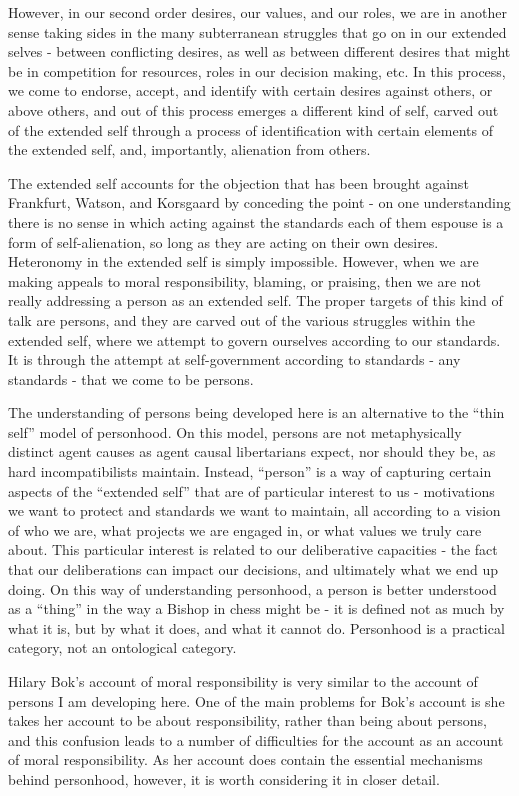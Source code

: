 \documentclass[phd,12pt,oneside,paper=letterpaper]{ubcthesis}
\begin{document}
However, in our second order desires, our values, and our roles, we are in another sense taking sides in the many subterranean struggles that go on in our extended selves - between conflicting desires, as well as between different desires that might be in competition for resources, roles in our decision making, etc. In this process, we come to endorse, accept, and identify with certain desires against others, or above others, and out of this process emerges a different kind of self, carved out of the extended self through a process of identification with certain elements of the extended self, and, importantly, alienation from others. 

The extended self accounts for the objection that has been brought against Frankfurt, Watson, and Korsgaard by conceding the point - on one understanding there is no sense in which acting against the standards each of them espouse is a form of self-alienation, so long as they are acting on their own desires. Heteronomy in the extended self is simply impossible. However, when we are making appeals to moral responsibility, blaming, or praising, then we are not really addressing a person as an extended self. The proper targets of this kind of talk are persons, and they are carved out of the various struggles within the extended self, where we attempt to govern ourselves according to our standards. It is through the attempt at self-government according to standards - any standards - that we come to be persons. 

The understanding of persons being developed here is an alternative to the ``thin self'' model of personhood. On this model, persons are not metaphysically distinct agent causes as agent causal libertarians expect, nor should they be, as hard incompatibilists maintain. Instead, ``person'' is a way of capturing certain aspects of the ``extended self'' that are of particular interest to us - motivations we want to protect and standards we want to maintain, all according to a vision of who we are, what projects we are engaged in, or what values we truly care about. This particular interest is related to our deliberative capacities - the fact that our deliberations can impact our decisions, and ultimately what we end up doing. On this way of understanding personhood, a person is better understood as a ``thing'' in the way a Bishop in chess might be - it is defined not as much by what it is, but by what it does, and what it cannot do. Personhood is a practical category, not an ontological category.

Hilary Bok's account of moral responsibility is very similar to the account of persons I am developing here. One of the main problems for Bok's account is she takes her account to be about responsibility, rather than being about persons, and this confusion leads to a number of difficulties for the account as an account of moral responsibility. As her account does contain the essential mechanisms behind personhood, however, it is worth considering it in closer detail. 
\end{document}
